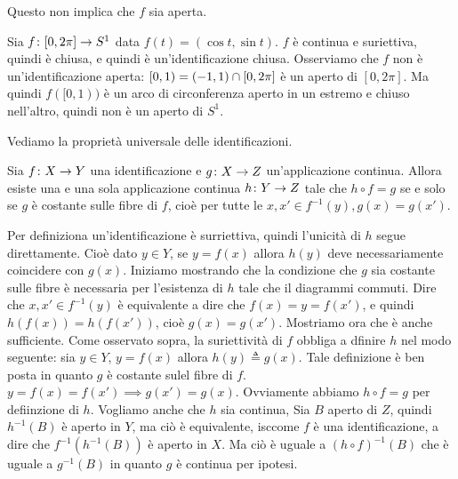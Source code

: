 \documentclass[a4paper]{article}
\begin{document}
Questo non implica che \(f\) sia aperta.

\begin{snippetexample}{}
    Sia \(f \colon [0,2\pi] \to S^1\)
    data \(f(t) = (\cos t, \sin t)\).
    \(f\) è continua e suriettiva, quindi è chiusa, e quindi è un'identificazione
    chiusa. Osserviamo che \(f\) non è un'identificazione aperta:
    \([0,1) = (-1, 1) \cap [0, 2\pi]\) è un aperto di \([0,2\pi]\).
    Ma quindi \(f([0,1))\) è un arco di circonferenza aperto in un estremo e chiuso nell'altro,
    quindi non è un aperto di \(S^1\).
\end{snippetexample}

Vediamo la proprietà universale delle identificazioni.

\begin{snippetproposition}{}
    Sia \(f \colon X \to Y\) una identificazione e \(g\colon X \to Z\)
    un'applicazione continua. Allora esiste una e una sola applicazione continua
    \(h\colon Y \to Z\) tale che \(h \circ f = g\) se e solo se \(g\)
    è costante sulle fibre di \(f\), cioè per tutte le \(x,x' \in f^{-1}(y), g(x) = g(x')\).
\end{snippetproposition}

\begin{center}
\end{center}

\begin{snippetproof}{}
    Per definiziona un'identificazione è surriettiva, quindi l'unicità di \(h\)
    segue direttamente. Cioè dato \(y \in Y\),
    se \(y = f(x)\) allora \(h(y)\) deve necessariamente coincidere con \(g(x)\).
    Iniziamo mostrando che la condizione che \(g\) sia costante sulle fibre è necessaria
    per l'esistenza di \(h\) tale che il diagrammi commuti.
    Dire che \(x,x' \in f^{-1}(y)\) è equivalente a dire che \(f(x) = y = f(x')\),
    e quindi \(h(f(x)) = h(f(x'))\), cioè \(g(x)=g(x')\).
    Mostriamo ora che è anche sufficiente.
    Come osservato sopra, la suriettività di \(f\) obbliga a dfinire \(h\)
    nel modo seguente: sia \(y\in Y\), \(y=f(x)\) allora \(h(y) \triangleq g(x)\).
    Tale definizione è ben posta in quanto \(g\) è costante sulel fibre di \(f\).
    \(y = f(x) = f(x') \implies g(x') = g(x)\).
    Ovviamente abbiamo \(h \circ f = g\) per defiinzione di \(h\).
    Vogliamo anche che \(h\) sia continua,
    Sia \(B\) aperto di \(Z\), quindi \(h^{-1}(B)\) è aperto in \(Y\),
    ma ciò è equivalente, isccome \(f\) è una identificazione, a dire che
    \(f^{-1}(h^{-1}(B))\) è aperto in \(X\).
    Ma ciò è uguale a \((h\circ f)^{-1}(B)\) che è uguale a \(g^{-1}(B)\)
    in quanto \(g\) è continua per ipotesi.
\end{snippetproof}
\end{document}
